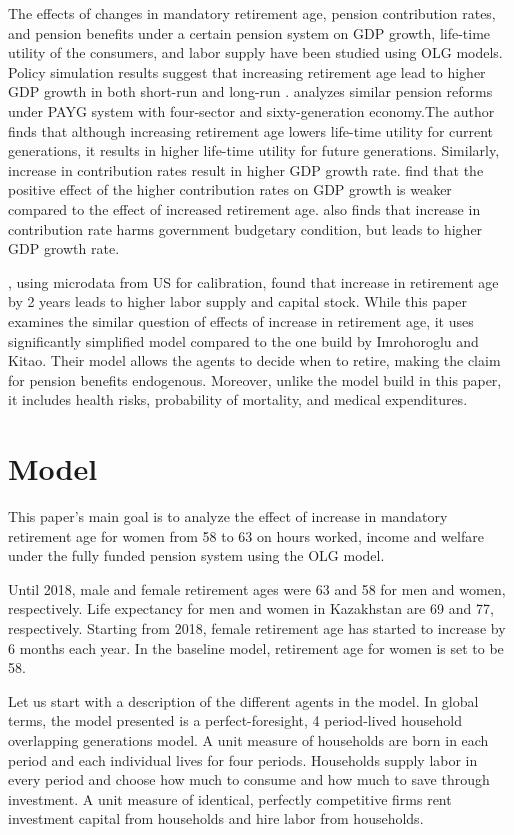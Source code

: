 \documentclass[ProjectUYA]{subfiles}
\begin{document}
The effects of changes in mandatory retirement age, pension contribution rates, and pension benefits under a certain pension system on GDP growth, life-time utility of the consumers, and labor supply have been studied using OLG models. Policy simulation results suggest that increasing retirement age lead to higher GDP growth in both short-run and long-run \cite{cournede}. \cite{hsu} analyzes similar pension reforms under PAYG system with four-sector and sixty-generation economy.The author finds that although increasing retirement age lowers life-time utility for current generations, it results in higher life-time utility for future generations. Similarly, increase in contribution rates result in higher GDP growth rate. \cite{karam} find that the positive effect of the higher contribution rates on GDP growth is weaker compared to the effect of increased retirement age. \cite{hsu} also finds that increase in contribution rate harms government budgetary condition, but leads to higher GDP growth rate.

\cite{imroh}, using microdata from US for calibration, found that increase in retirement age by 2 years leads to higher labor supply and capital stock. While this paper examines the similar question of effects of increase in retirement age, it uses significantly simplified model compared to the one build by Imrohoroglu and Kitao. Their model allows the agents to decide when to retire, making the claim for pension benefits endogenous. Moreover, unlike the model build in this paper, it includes health risks, probability of mortality, and medical expenditures.


\section{Model}
This paper's main goal is to analyze the effect of increase in mandatory retirement age for women from 58 to 63 on hours worked, income and welfare under the fully funded pension system using the OLG model.

Until 2018, male and female retirement ages were 63 and 58 for men and women, respectively. Life expectancy for men and women in Kazakhstan are 69 and 77, respectively. Starting from 2018, female retirement age has started to increase by 6 months each year. In the baseline model, retirement age for women is set to be 58. 

 Let us start with a description of the different agents in the model. In global terms, the model presented is a perfect-foresight, 4 period-lived household overlapping generations model. A unit measure 
 of households are born in each period and each individual lives for four periods. Households supply labor in every period and choose how much to consume and how much to save through investment. A unit measure of identical, perfectly competitive firms rent investment capital from households and hire labor from households. 
\end{document}
